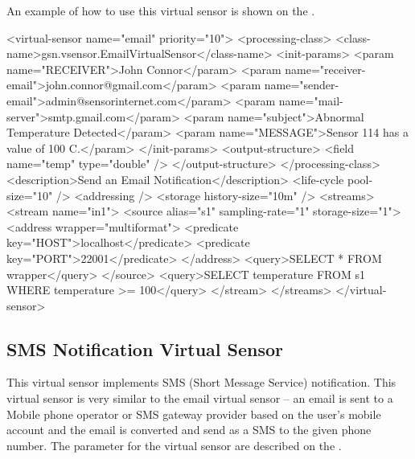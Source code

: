 An example of how to use this virtual sensor is shown on the .

\begin{xmlcode}[caption={Sample of Email Notification VSD file}, label=listing:xml:emailnotification_vsd]
<virtual-sensor name="email" priority="10">
	<processing-class>
		<class-name>gsn.vsensor.EmailVirtualSensor</class-name>
		<init-params>
			<param name="RECEIVER">John Connor</param>
			<param name="receiver-email">john.connor@gmail.com</param>
			<param name="sender-email">admin@sensorinternet.com</param>
			<param name="mail-server">smtp.gmail.com</param>
			<param name="subject">Abnormal Temperature Detected</param>
			<param name="MESSAGE">Sensor 114 has a value of 100 C.</param>   
		</init-params>
		<output-structure>
			<field name="temp" type="double" />
		</output-structure>
	</processing-class>
	<description>Send an Email Notification</description>
	<life-cycle pool-size="10" />
	<addressing />
	<storage history-size="10m" />
	<streams>
		<stream name="in1">
			<source alias="s1" sampling-rate="1" storage-size="1">
				<address wrapper="multiformat">
					<predicate key="HOST">localhost</predicate>
					<predicate key="PORT">22001</predicate>
				</address>
				<query>SELECT * FROM wrapper</query>
			</source>
			<query>SELECT temperature FROM s1 WHERE temperature >= 100</query>
		</stream>
	</streams>
</virtual-sensor>
\end{xmlcode}


\subsection{SMS Notification Virtual Sensor \label{quickref_sms_notification_vs}}

This virtual sensor implements SMS (Short Message Service) notification. This virtual sensor is very similar to the email virtual sensor – an email is sent to a Mobile phone operator or SMS gateway provider based on the user's mobile account and the email is converted and send as a SMS to the given phone number. The parameter for the virtual sensor are described on the .


